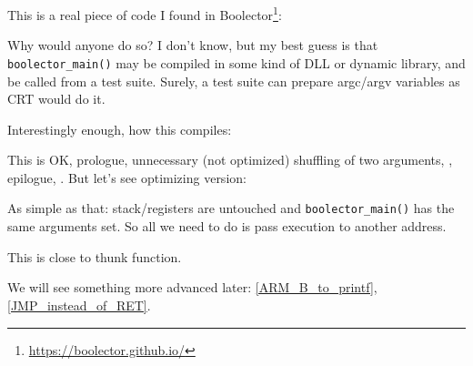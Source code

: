\label{Boolector}

This is a real piece of code I found in Boolector\footnote{\url{https://boolector.github.io/}}:



Why would anyone do so?
I don't know, but my best guess is that \verb|boolector_main()| may be compiled in some kind of DLL or dynamic library,
and be called from a test suite.
Surely, a test suite can prepare argc/argv variables as \ac{CRT} would do it.

Interestingly enough, how this compiles:



This is OK, prologue, unnecessary (not optimized) shuffling of two arguments, , epilogue, .
But let's see optimizing version:



As simple as that: stack/registers are untouched and \verb|boolector_main()| has the same arguments set.
So all we need to do is pass execution to another address.

This is close to \gls{thunk function}.

We will see something more advanced later: \ref{ARM_B_to_printf}, \ref{JMP_instead_of_RET}.

